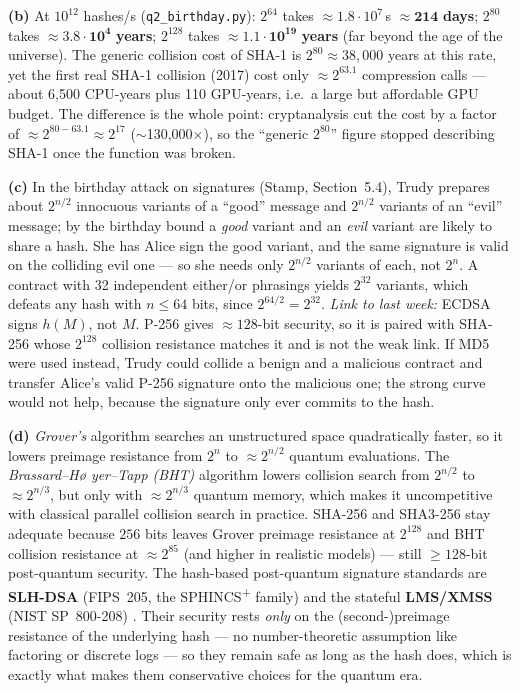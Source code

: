 \documentclass[11pt,a4paper]{article}
\begin{document}
\textbf{(b)} At $10^{12}$ hashes/s (\texttt{q2\_birthday.py}):
$2^{64}$ takes $\approx 1.8\cdot 10^{7}$\,s $\approx \mathbf{214}$ \textbf{days};
$2^{80}$ takes $\approx \mathbf{3.8\cdot 10^{4}}$ \textbf{years};
$2^{128}$ takes $\approx \mathbf{1.1\cdot 10^{19}}$ \textbf{years} (far beyond the age of the universe).
The generic collision cost of SHA-1 is $2^{80}\approx 38{,}000$ years at this rate, yet the first real
SHA-1 collision (2017) cost only $\approx 2^{63.1}$ compression calls --- about 6{,}500 CPU-years plus
110 GPU-years, i.e.\ a large but affordable GPU budget. The difference is the whole point: cryptanalysis
cut the cost by a factor of $\approx 2^{80-63.1}\approx 2^{17}$ ($\sim$130{,}000$\times$), so the
``generic $2^{80}$'' figure stopped describing SHA-1 once the function was broken.

\textbf{(c)} In the birthday attack on signatures (Stamp, Section~5.4), Trudy prepares about $2^{n/2}$
innocuous variants of a ``good'' message and $2^{n/2}$ variants of an ``evil'' message; by the birthday
bound a \emph{good} variant and an \emph{evil} variant are likely to share a hash. She has Alice sign the
good variant, and the same signature is valid on the colliding evil one --- so she needs only $2^{n/2}$
variants of each, not $2^{n}$. A contract with 32 independent either/or phrasings yields $2^{32}$
variants, which defeats any hash with $n\le 64$ bits, since $2^{64/2}=2^{32}$. \emph{Link to last week:}
ECDSA signs $h(M)$, not $M$. P-256 gives $\approx 128$-bit security, so it is paired with SHA-256 whose
$2^{128}$ collision resistance matches it and is not the weak link. If MD5 were used instead, Trudy could
collide a benign and a malicious contract and transfer Alice's valid P-256 signature onto the malicious
one; the strong curve would not help, because the signature only ever commits to the hash.

\textbf{(d)} \emph{Grover's} algorithm searches an unstructured space quadratically faster, so it lowers
preimage resistance from $2^{n}$ to $\approx 2^{n/2}$ quantum evaluations. The \emph{Brassard--H\o
yer--Tapp (BHT)} algorithm lowers collision search from $2^{n/2}$ to $\approx 2^{n/3}$, but only with
$\approx 2^{n/3}$ quantum memory, which makes it uncompetitive with classical parallel collision search
in practice. SHA-256 and SHA3-256 stay adequate because $256$ bits leaves Grover preimage resistance at
$2^{128}$ and BHT collision resistance at $\approx 2^{85}$ (and higher in realistic models) --- still
$\ge 128$-bit post-quantum security. The hash-based post-quantum signature standards are
\textbf{SLH-DSA} (FIPS~205, the SPHINCS\textsuperscript{+} family) \cite{fips205} and the stateful
\textbf{LMS/XMSS} (NIST SP~800-208) \cite{sp800208}. Their security rests \emph{only} on the
(second-)preimage resistance of the underlying hash --- no number-theoretic assumption like factoring or
discrete logs --- so they remain safe as long as the hash does, which is exactly what makes them
conservative choices for the quantum era.
\end{document}
